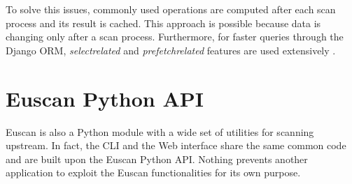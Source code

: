 To solve this issues, commonly used operations are computed after each scan process and its result is cached. This approach is possible because data is changing only after a scan process. Furthermore, for faster queries through the Django ORM, \emph{select\textunderscore related} and \emph{prefetch\textunderscore related} features are used extensively \cite{django_orm}.

\section{Euscan Python API}
Euscan is also a Python module with a wide set of utilities for scanning upstream. In fact, the CLI and the Web interface share the same common code and are built upon the Euscan Python API. Nothing prevents another application to exploit the Euscan functionalities for its own purpose.
